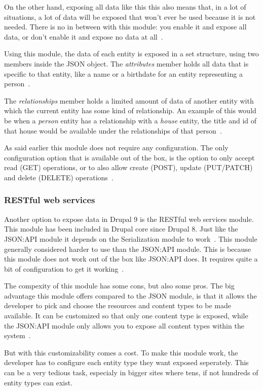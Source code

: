 On the other hand, exposing all data like this this also means that, in a lot of situations, a lot of data will be exposed that won't ever be used because it is not needed. There is no in between with this module: you enable it and expose all data, or don't enable it and expose no data at all~\autocite{So2018}.

Using this module, the data of each entity is exposed in a set structure, using two members inside the JSON object. The \emph{attributes} member holds all data that is specific to that entity, like a name or a birthdate for an entity representing a person~\autocite{Drupal2019}. 

The \emph{relationships} member holds a limited amount of data of another entity with which the current entity has some kind of relationship. An example of this would be when a \emph{person} entity has a relationship with a \emph{house} entity, the title and id of that house would be available under the relationships of that person~\autocite{Drupal2019}.

As said earlier this module does not require any configuration. The only configuration option that is available out of the box, is the option to only accept read (GET) operations, or to also allow create (POST), update (PUT/PATCH) and delete (DELETE) operations~\autocite{So2018}.


\subsubsection{RESTful web services}

Another option to expose data in Drupal 9 is the RESTful web services module. This module has been included in Drupal core since Drupal 8. Just like the JSON:API module it depends on the Serialization module to work~\autocite{Drupal2018}.
This module generally considered harder to use than the JSON:API module. This is because this module does not work out of the box like JSON:API does. It requires quite a bit of configuration to get it working~\autocite{Drupal2018}.

The compexity of this module has some cons, but also some pros. The big advantage this module offers compared to the JSON module, is that it allows the developer to pick and choose the resources and content types to be made available. It can be customized so that only one content type is exposed, while the JSON:API module only allows you to expose all content types within the system~\autocite{So2018}. 

But with this customizability comes a cost. To make this module work, the developer has to configure each entity type they want exposed seperately. This can be a very tedious task, especialy in bigger sites where tens, if not hundreds of entity types can exist.

